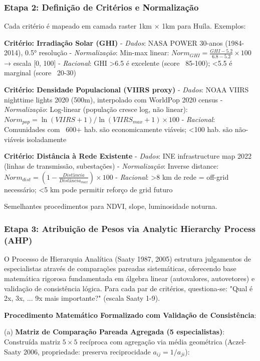 \documentclass[12pt, a4paper]{article}
\begin{document}
\subsubsection{Etapa 2: Definição de Critérios e Normalização}

Cada critério é mapeado em camada raster 1km × 1km para Huíla. Exemplos:

\textbf{Critério: Irradiação Solar (GHI)}
- \textit{Dados}: NASA POWER 30-anos (1984-2014), 0.5° resolução
- \textit{Normalização}: Min-max linear: $Norm_{GHI} = \frac{GHI - 5.2}{6.8 - 5.2} \times 100$ → escala [0, 100]
- \textit{Racional}: GHI >6.5 é excelente (score ~85-100); <5.5 é marginal (score ~20-30)

\textbf{Critério: Densidade Populacional (VIIRS proxy)}
- \textit{Dados}: NOAA VIIRS nighttime lights 2020 (500m), interpolado com WorldPop 2020 census
- \textit{Normalização}: Log-linear (população cresce log, não linear): $Norm_{pop} = \ln(VIIRS + 1) / \ln(VIIRS_{max} + 1) \times 100$
- \textit{Racional}: Comunidades com ~600+ hab. são economicamente viáveis; <100 hab. são não-viáveis isoladamente

\textbf{Critério: Distância à Rede Existente}
- \textit{Dados}: INE infrastructure map 2022 (linhas de transmissão, subestações)
- \textit{Normalização}: Inverse distance: $Norm_{dist} = (1 - \frac{Distância}{Distância_{max}}) \times 100$
- \textit{Racional}: >8 km de rede = off-grid necessário; <5 km pode permitir reforço de grid futuro

Semelhantes procedimentos para NDVI, slope, luminosidade noturna.

\subsubsection{Etapa 3: Atribuição de Pesos via Analytic Hierarchy Process (AHP)}

O Processo de Hierarquia Analítica (Saaty 1987, 2005) estrutura julgamentos de especialistas através de comparações pareadas sistemáticas, oferecendo base matemática rigorosa fundamentada em álgebra linear (autovalores, autovetores) e validação de consistência lógica. Para cada par de critérios, questiona-se: "Qual é 2x, 3x, ... 9x mais importante?" (escala Saaty 1-9).

\textbf{Procedimento Matemático Formalizado com Validação de Consistência}:

(a) \textbf{Matriz de Comparação Pareada Agregada (5 especialistas)}: Construída matriz $5 \times 5$ recíproca com agregação via média geométrica (Aczel-Saaty 2006, propriedade: preserva reciprocidade $a_{ij} = 1/a_{ji}$):
\end{document}
